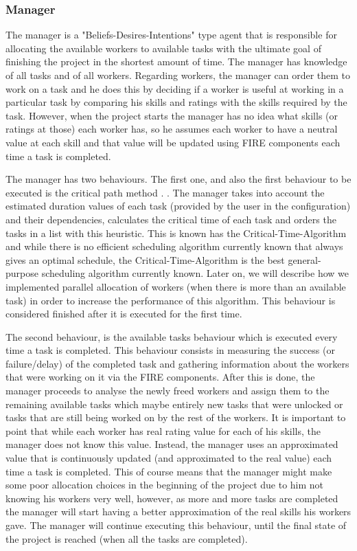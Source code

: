 \documentclass[paper=a4, fontsize=11pt]{scrartcl} %
\numberwithin{equation}{section} %
\numberwithin{figure}{section} %
\numberwithin{table}{section} %
\begin{document}
\subsubsection{Manager}
The manager is a "Beliefs-Desires-Intentions" type agent that is responsible for allocating the available workers to available tasks with the ultimate goal of finishing the project in the shortest amount of time. The manager has knowledge of all tasks and of all workers. Regarding workers, the manager can order them to work on a task and he does this by deciding if a worker is useful at working in a particular task by comparing his skills and ratings with the skills required by the task. However, when the project starts the manager has no idea what skills (or ratings at those) each worker has, so he assumes each worker to have a neutral value at each skill and that value will be updated using FIRE components each time a task is completed.

The manager has two behaviours. The first one, and also the first behaviour to be executed is the critical path method \cite{cpm}. . The manager takes into account the estimated duration values of each task (provided by the user in the configuration) and their dependencies, calculates the critical time of each task and orders the tasks in a list with this heuristic. This is known has the Critical-Time-Algorithm and while there is no efficient scheduling algorithm currently known that always gives an optimal schedule, the Critical-Time-Algorithm is the best general-purpose scheduling algorithm currently known. Later on, we will describe how we implemented parallel allocation of workers (when there is more than an available task) in order to increase the performance of this algorithm. This behaviour is considered finished after it is executed for the first time.


The second behaviour, is the available tasks behaviour which is executed every time a task is completed. This behaviour consists in measuring the success (or failure/delay) of the completed task and gathering information about the workers that were working on it via the FIRE components. After this is done, the manager proceeds to analyse the newly freed workers and assign them to the remaining available tasks which maybe entirely new tasks that were unlocked or tasks that are still being worked on by the rest of the workers. It is important to point that while each worker has real rating value for each of his skills, the manager does not know this value. Instead, the manager uses an approximated value that is continuously updated (and approximated to the real value) each time a task is completed. This of course means that the manager might make some poor allocation choices in the beginning of the project due to him not knowing his workers very well, however, as more and more tasks are completed the manager will start having a better approximation of the real skills his workers gave. The manager will continue executing this behaviour, until the final state of the project is reached (when all the tasks are completed).
\end{document}
